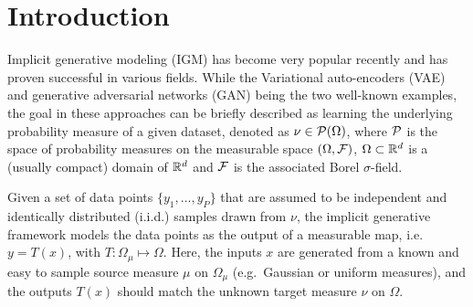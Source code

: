 
\section{Introduction}





Implicit generative modeling (IGM) \cite{diggle1984monte, mohamed2016learning} has become very popular recently and has proven
successful in various fields. While the Variational auto-encoders (VAE) \cite{kingma2013VAE} and generative adversarial networks (GAN) \cite{goodfellow2014generative} being the two well-known examples, the goal in these approaches can be briefly described as learning the
underlying probability measure of a given dataset, denoted as $\nu \in {\cal P}(\Omega)$, where ${\cal P}$ is the space of probability measures on the measurable space $(\Omega,\mathcal{F})$, $\Omega \subset \mathbb{R}^d$ is a (usually compact) domain of $\mathbb{R}^d$ and $\mathcal{F}$ is the associated Borel $\sigma$-field. 

Given a set of data points $\{y_1 , \dots , y_P \}$ that are assumed to be independent and identically distributed (i.i.d.) samples drawn from $\nu$, the implicit generative framework models the data points as the output of a measurable map, i.e.\ $y = T(x)$, with $T: \Omega_\mu \mapsto \Omega$. Here, the inputs $x$ are generated from a known and easy to sample source measure $\mu$ on $\Omega_\mu$ (e.g.\ Gaussian or uniform measures), and the outputs $T(x)$ should match the unknown target measure $\nu$ on $\Omega$. 

